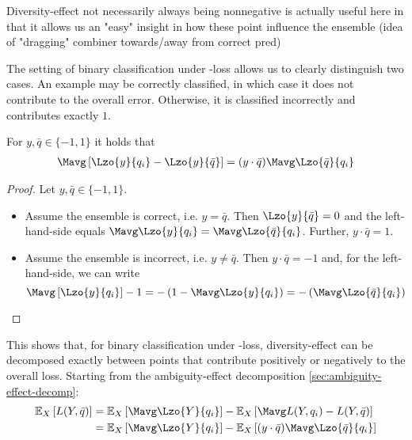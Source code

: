 \documentclass[../main.tex]{subfiles}
\begin{document}
Diversity-effect not necessarily always being nonnegative is actually useful here in that it allows us an "easy" insight in how these point influence the ensemble (idea of "dragging" combiner towards/away from correct pred)

The setting of binary classification under \zeroone-loss allows us to clearly distinguish two cases. An example may be correctly classified, in which case it does not contribute to the overall error. Otherwise, it is classified incorrectly and contributes exactly $1$.

\begin{lemma} 
For $y, \bar{q} \in \{ -1, 1 \}$ it holds that 
\begin{align}
\Mavg \left[\Lzo{y}{q_{i}} - \Lzo{y}{\bar{q}}\right] 
= (y \cdot \bar{q}) \Mavg \Lzo{\bar{q}}{q_{i}}
\end{align}
\end{lemma}
\begin{proof} Let $y, \bar{q} \in \{ -1, 1 \}$.
\begin{itemize}
\item Assume the ensemble is correct, i.e. $y=\bar{q}$. Then $\Lzo{y}{\bar{q}} = 0$ and the left-hand-side equals $\Mavg\Lzo{y}{q_{i}} = \Mavg\Lzo{\bar{q}}{q_{i}}$. Further, $y \cdot \bar{q} = 1$.
\item Assume the ensemble is incorrect, i.e. $y \not= \bar{q}$. Then $y \cdot \bar{q} = -1$ and, for the left-hand-side, we can write
$$
\Mavg \left[\Lzo{y}{q_{i}}\right] - 1 = - \left(1 - \Mavg \Lzo{y}{q_{i}}\right) = - \left(\Mavg \Lzo{\bar{q}}{q_{i}} \right)
$$
\end{itemize}
\end{proof}
This shows that, for binary classification under \zeroone-loss, diversity-effect can be decomposed exactly between points that contribute positively or negatively to the overall loss.
 Starting from the 
ambiguity-effect decomposition \ref{sec:ambiguity-effect-decomp}:
\begin{align*}
\mathbb{E}_{X}\left[   
L(Y, \bar{q}) 
\right]
&= 
\mathbb{E}_{X}\left[    \Mavg \Lzo{Y}{q_{i}}  \right]
-
\mathbb{E}_{X}\left[   
\Mavg L(Y, q_{i}) - L(Y, \bar{q})
\right]
\\
&= 
\mathbb{E}_{X}\left[ \Mavg \Lzo{Y}{q_{i}} \right] - \mathbb{E}_{X}\left[ (y \cdot \bar{q}) \Mavg \Lzo{\bar{q}}{q_{i}} \right] 
\end{align*}
\end{document}
